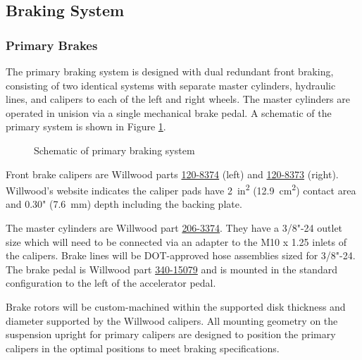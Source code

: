 \documentclass[10pt]{article}
\begin{document}
\subsection{Braking System}
\subsubsection{Primary Brakes}
The primary braking system is designed with dual redundant front braking, consisting of two identical systems with separate master cylinders, hydraulic lines, and calipers to each of the left and right wheels. The master cylinders are operated in unision via a single mechanical brake pedal. A schematic of the primary system is shown in Figure \ref{fig:primary-brakes-schematic}.

\begin{figure}
\centering
\caption{Schematic of primary braking system}
\label{fig:primary-brakes-schematic}
\end{figure}

Front brake calipers are Willwood parts \href{http://www.wilwood.com/Calipers/CaliperProd.aspx?itemno=120-8374}{120-8374} (left) and \href{http://www.wilwood.com/Calipers/CaliperProd.aspx?itemno=120-8373}{120-8373} (right). Willwood's website indicates the caliper pads have \SI{2}{in\squared} (\SI{12.9}{\centi\metre\squared}) contact area and 0.30" (\SI{7.6}{\milli\metre}) depth including the backing plate.

The master cylinders are Willwood part \href{http://www.wilwood.com/MasterCylinders/MasterCylinderProd.aspx?itemno=260-3374}{206-3374}. They have a 3/8"-24 outlet size which will need to be connected via an adapter to the M10 x 1.25 inlets of the calipers. Brake lines will be DOT-approved hose assemblies sized for 3/8"-24. The brake pedal is Willwood part \href{http://www.wilwood.com/Pedals/PedalProd.aspx?itemno=340-15079}{340-15079} and is mounted in the standard configuration to the left of the accelerator pedal.

Brake rotors will be custom-machined within the supported disk thickness and diameter supported by the Willwood calipers. All mounting geometry on the suspension upright for primary calipers are designed to position the primary calipers in the optimal positions to meet braking specifications.
\end{document}
